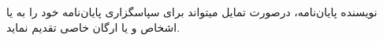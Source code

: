 \begin{acknowledgementpage}

\vspace{1.5cm}

{\nastaliq
{
 نويسنده پايان‌نامه، درصورت تمايل ميتواند برای سپاسگزاری پايان‌نامه خود را به يا اشخاص و يا ارگان خاصی تقدیم نماید.
}}\end{acknowledgementpage}
\newpage